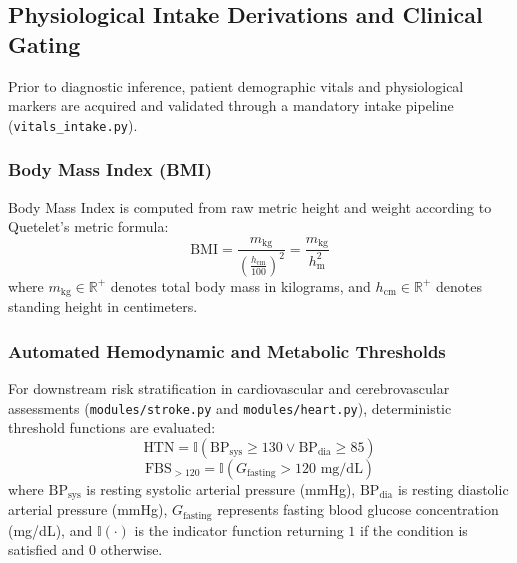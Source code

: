 
\subsection{Physiological Intake Derivations and Clinical Gating}
Prior to diagnostic inference, patient demographic vitals and physiological markers are acquired and validated through a mandatory intake pipeline (\texttt{vitals\_intake.py}).

\subsubsection{Body Mass Index (BMI)}
Body Mass Index is computed from raw metric height and weight according to Quetelet's metric formula:
\begin{equation}
    \text{BMI} = \frac{m_{\text{kg}}}{\left(\frac{h_{\text{cm}}}{100}\right)^2} = \frac{m_{\text{kg}}}{h_{\text{m}}^2}
    \label{eq:bmi}
\end{equation}
where $m_{\text{kg}} \in \mathbb{R}^+$ denotes total body mass in kilograms, and $h_{\text{cm}} \in \mathbb{R}^+$ denotes standing height in centimeters.

\subsubsection{Automated Hemodynamic and Metabolic Thresholds}
For downstream risk stratification in cardiovascular and cerebrovascular assessments (\texttt{modules/stroke.py} and \texttt{modules/heart.py}), deterministic threshold functions are evaluated:
\begin{equation}
    \text{HTN} = \mathbb{I}\left(\text{BP}_{\text{sys}} \ge 130 \lor \text{BP}_{\text{dia}} \ge 85\right)
    \label{eq:htn}
\end{equation}
\begin{equation}
    \text{FBS}_{>120} = \mathbb{I}\left(G_{\text{fasting}} > 120\text{ mg/dL}\right)
    \label{eq:fbs}
\end{equation}
where $\text{BP}_{\text{sys}}$ is resting systolic arterial pressure (mmHg), $\text{BP}_{\text{dia}}$ is resting diastolic arterial pressure (mmHg), $G_{\text{fasting}}$ represents fasting blood glucose concentration (mg/dL), and $\mathbb{I}(\cdot)$ is the indicator function returning $1$ if the condition is satisfied and $0$ otherwise.

